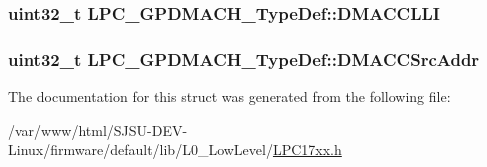 \subsubsection[{\texorpdfstring{D\+M\+A\+C\+C\+L\+LI}{DMACCLLI}}]{ uint32\+\_\+t L\+P\+C\+\_\+\+G\+P\+D\+M\+A\+C\+H\+\_\+\+Type\+Def\+::\+D\+M\+A\+C\+C\+L\+LI}\hypertarget{structLPC__GPDMACH__TypeDef_abeb9b41622d5ef0b5be547eddae122ff}{}\label{structLPC__GPDMACH__TypeDef_abeb9b41622d5ef0b5be547eddae122ff}
\subsubsection[{\texorpdfstring{D\+M\+A\+C\+C\+Src\+Addr}{DMACCSrcAddr}}]{ uint32\+\_\+t L\+P\+C\+\_\+\+G\+P\+D\+M\+A\+C\+H\+\_\+\+Type\+Def\+::\+D\+M\+A\+C\+C\+Src\+Addr}\hypertarget{structLPC__GPDMACH__TypeDef_a6b0842b5ab5e43501d684f874cd5ad79}{}\label{structLPC__GPDMACH__TypeDef_a6b0842b5ab5e43501d684f874cd5ad79}


The documentation for this struct was generated from the following file\+:\begin{DoxyCompactItemize}
\item 
/var/www/html/\+S\+J\+S\+U-\/\+D\+E\+V-\/\+Linux/firmware/default/lib/\+L0\+\_\+\+Low\+Level/\hyperlink{LPC17xx_8h}{L\+P\+C17xx.\+h}\end{DoxyCompactItemize}
